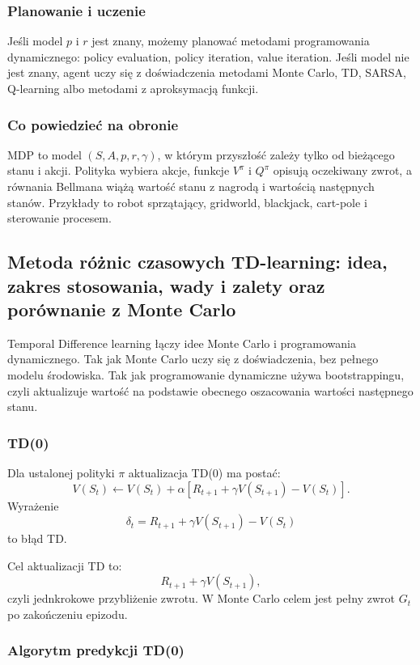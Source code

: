 \subsubsection{Planowanie i uczenie}

Jeśli model $p$ i $r$ jest znany, możemy planować metodami programowania dynamicznego: policy evaluation, policy iteration, value iteration. Jeśli model nie jest znany, agent uczy się z doświadczenia metodami Monte Carlo, TD, SARSA, Q-learning albo metodami z aproksymacją funkcji.

\subsubsection{Co powiedzieć na obronie}

MDP to model $(S,A,p,r,\gamma)$, w którym przyszłość zależy tylko od bieżącego stanu i akcji. Polityka wybiera akcje, funkcje $V^\pi$ i $Q^\pi$ opisują oczekiwany zwrot, a równania Bellmana wiążą wartość stanu z nagrodą i wartością następnych stanów. Przykłady to robot sprzątający, gridworld, blackjack, cart-pole i sterowanie procesem.

\subsection{Metoda różnic czasowych TD-learning: idea, zakres stosowania, wady i zalety oraz porównanie z Monte Carlo}

Temporal Difference learning łączy idee Monte Carlo i programowania dynamicznego. Tak jak Monte Carlo uczy się z doświadczenia, bez pełnego modelu środowiska. Tak jak programowanie dynamiczne używa bootstrappingu, czyli aktualizuje wartość na podstawie obecnego oszacowania wartości następnego stanu.

\subsubsection{TD(0)}

Dla ustalonej polityki $\pi$ aktualizacja TD(0) ma postać:
\[
V(S_t)\leftarrow V(S_t)+\alpha\left[R_{t+1}+\gamma V(S_{t+1})-V(S_t)\right].
\]
Wyrażenie
\[
\delta_t=R_{t+1}+\gamma V(S_{t+1})-V(S_t)
\]
to błąd TD.

Cel aktualizacji TD to:
\[
R_{t+1}+\gamma V(S_{t+1}),
\]
czyli jednkrokowe przybliżenie zwrotu. W Monte Carlo celem jest pełny zwrot $G_t$ po zakończeniu epizodu.

\subsubsection{Algorytm predykcji TD(0)}

